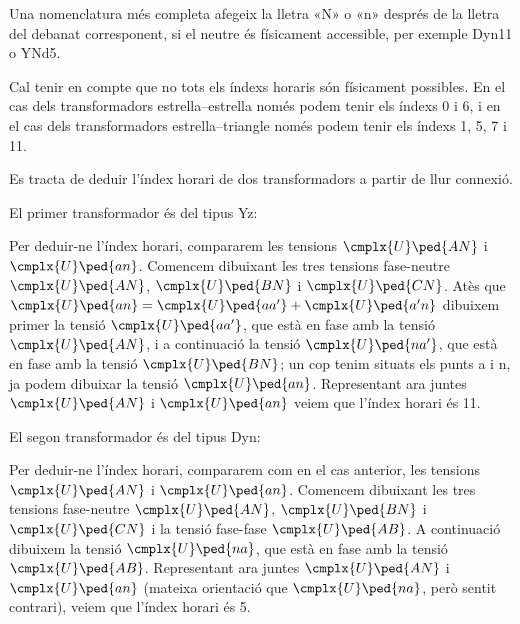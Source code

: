 Una nomenclatura més completa afegeix la lletra «N» o «n» després de la lletra del debanat corresponent, si el neutre és físicament accessible, per exemple Dyn11 o YNd5.

Cal tenir en compte que no tots els índexs horaris són físicament possibles. En el cas dels transformadors estrella--estrella només podem tenir els índexs 0 i 6, i en el cas dels transformadors estrella--triangle només podem tenir els índexs 1, 5, 7 i 11.

\begin{exemple}[\IndexHorari{}]
	\addcontentsxms{\IndexHorari}
    Es tracta de deduir l'índex horari de dos transformadors a partir de llur connexió.


    El primer transformador és del tipus Yz:
     \vspace{-2mm}
    \begin{center}
        
    \end{center}
     Per deduir-ne l'índex horari, compararem les tensions
    $\cmplx{U}\ped{AN}$ i $\cmplx{U}\ped{an}$. Comencem dibuixant les tres tensions fase-neutre $\cmplx{U}\ped{AN}$, $\cmplx{U}\ped{BN}$ i $\cmplx{U}\ped{CN}$. Atès que $\cmplx{U}\ped{an} = \cmplx{U}\ped{aa'} + \cmplx{U}\ped{a'n}$ dibuixem primer la tensió $\cmplx{U}\ped{aa'}$, que està en fase amb la tensió $\cmplx{U}\ped{AN}$, i a continuació la tensió $\cmplx{U}\ped{na'}$, que està en fase amb la tensió $\cmplx{U}\ped{BN}$; un cop tenim situats els punts a i n, ja podem dibuixar la tensió $\cmplx{U}\ped{an}$. Representant ara juntes $\cmplx{U}\ped{AN}$ i $\cmplx{U}\ped{an}$  veiem que l'índex horari és 11.


     El segon transformador és del tipus Dyn:
      \vspace{-2mm}
    \begin{center}
       
    \end{center}
      Per  deduir-ne l'índex horari, compararem com en el cas anterior, les tensions $\cmplx{U}\ped{AN}$ i $\cmplx{U}\ped{an}$. Comencem dibuixant les tres tensions fase-neutre $\cmplx{U}\ped{AN}$, $\cmplx{U}\ped{BN}$ i $\cmplx{U}\ped{CN}$ i la tensió fase-fase $\cmplx{U}\ped{AB}$.  A continuació dibuixem la tensió $\cmplx{U}\ped{na}$, que està en fase amb la tensió $\cmplx{U}\ped{AB}$. Representant ara juntes $\cmplx{U}\ped{AN}$ i $\cmplx{U}\ped{an}$ (mateixa orientació que $\cmplx{U}\ped{na}$, però sentit contrari),  veiem que l'índex horari és 5.
\end{exemple}

